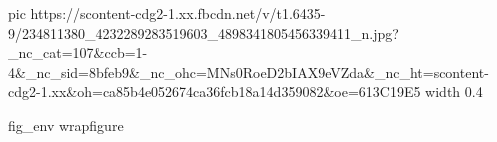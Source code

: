  
 
 
 
 

\ifcmt
  pic https://scontent-cdg2-1.xx.fbcdn.net/v/t1.6435-9/234811380_4232289283519603_4898341805456339411_n.jpg?_nc_cat=107&ccb=1-4&_nc_sid=8bfeb9&_nc_ohc=MNs0RoeD2bIAX9eVZda&_nc_ht=scontent-cdg2-1.xx&oh=ca85b4e052674ca36fcb18a14d359082&oe=613C19E5
  width 0.4

	fig_env wrapfigure
\fi

